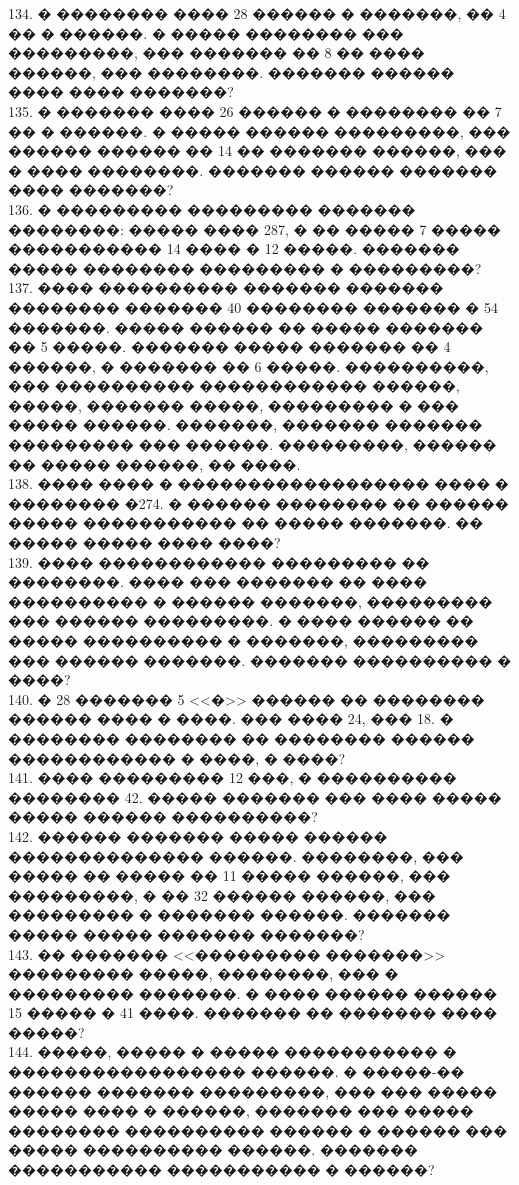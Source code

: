 \documentclass[12pt]{article}
\begin{document}
134. � �������� ���� 28 ������ � �������, �� 4 �� � ������. � ����� �������� ��� ���������, ��� ������� �� 8 �� ���� ������, ��� ��������. ������� ������ ���� ���� �������?\\
135. � ������� ���� 26 ������ � �������� �� 7 �� � ������. � ����� ������ ���������, ��� ������ ������ �� 14 �� ������� ������, ��� � ���� ��������. ������� ������ ������� ���� �������?\\
136. � ��������� ��������� ������� ��������: ����� ���� 287, � �� ����� 7 ����� ����������� 14 ���� � 12 �����. ������� ����� �������� ��������� � ���������?\\
137. ���� ���������� ������� ������� �������� ������� 40 �������� ������� � 54 �������. ����� ������ �� ����� ������� �� 5 �����. ������� ����� ������� �� 4 ������, � ������� �� 6 �����. ����������, ��� ���������� ������������ ������, �����, ������� �����, ��������� � ��� ����� ������. �������, ������� ������� ��������� ��� ������. ���������, ������ �� ����� ������, �� ����.\\
138. ���� ���� � ������������������ ���� � �������� �274. � ������ �������� �� ������ ����� ����������� �� ����� �������. �� ����� ����� ���� ����?\\
139. ���� ������������ ��������� �� ��������. ���� ��� ������� �� ���� ���������� � ������ �������, ��������� ��� ������ ���������. � ���� ������ �� ����� ���������� � �������, ��������� ��� ������ �������. ������� ���������� � ����?\\
140. � 28 ������� 5 <<�>> ������ �� �������� ������ ���� � ����. ��� ���� 24, ��� 18. � �������� �������� �� �������� ������ ������������ � ����, � ����?\\
141. ���� ��������� 12 ���, � ���������� �������� 42. ����� ������� ��� ���� ����� ����� ������ ����������?\\
142. ������ ������� ����� ������ �������������� ������. ��������, ��� ����� �� ����� �� 11 ����� ������, ��� ���������, � �� 32 ������ ������, ��� ��������� � ������� ������. ������� ����� ����� ������� �������?\\
143. �� ������� <<��������� �������>> ��������� �����, ��������, ��� � ��������� �������. � ���� ������ ������ 15 ����� � 41 ����. ������� �� ������� ���� �����?\\
144. �����, ����� � ����� ����������� � ����������������� ������. � �����-�� ������ ������� ���������, ��� ��� ����� ����� ���� � ������, ������� ��� ����� �������� ���������� ������ � ������ ��� ����� ���������� ������. ������� ����������� ����������� � ������?\\
\end{document}
